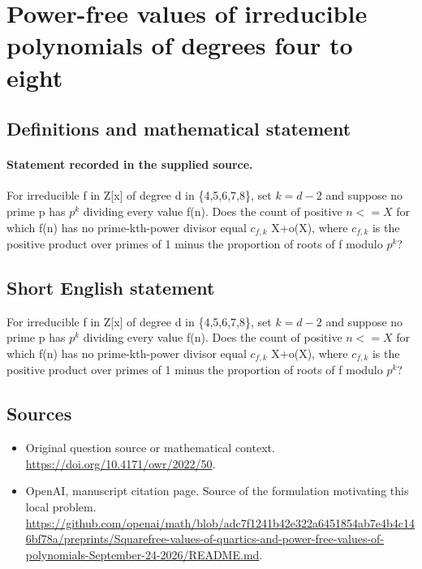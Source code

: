 \documentclass[11pt]{article}
\begin{document}
\section*{Power-free values of irreducible polynomials of degrees four to eight}\label{statement}
\subsection{Definitions and mathematical statement}
\paragraph{Statement recorded in the supplied source.}
For irreducible f in Z[x] of degree d in \{4,5,6,7,8\}, set $k=d-2$ and suppose no prime p has $p^k$ dividing every value f(n). Does the count of positive $n<=X$ for which f(n) has no prime-kth-power divisor equal $c_{f,k}$ X+o(X), where $c_{f,k}$ is the positive product over primes of 1 minus the proportion of roots of f modulo $p^k$?
\subsection{Short English statement}
For irreducible f in Z[x] of degree d in \{4,5,6,7,8\}, set $k=d-2$ and suppose no prime p has $p^k$ dividing every value f(n). Does the count of positive $n<=X$ for which f(n) has no prime-kth-power divisor equal $c_{f,k}$ X+o(X), where $c_{f,k}$ is the positive product over primes of 1 minus the proportion of roots of f modulo $p^k$?
\subsection{Sources}
\begin{itemize}
\item[S1] Original question source or mathematical context.
\url{https://doi.org/10.4171/owr/2022/50}.
\item[S2] OpenAI, manuscript citation page. Source of the formulation motivating this local problem.
\url{https://github.com/openai/math/blob/adc7f1241b42e322a6451854ab7e4b4c146bf78a/preprints/Squarefree-values-of-quartics-and-power-free-values-of-polynomials-September-24-2026/README.md}.
\end{itemize}
\end{document}
